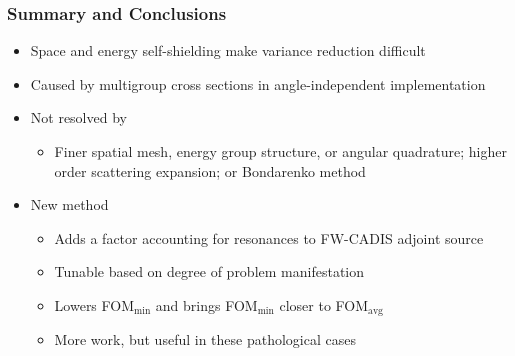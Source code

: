 \documentclass[xcolor=x11names,compress]{beamer}
\renewcommand{\(}{\begin{columns}}
\renewcommand{\)}{\end{columns}}
\newcommand{\<}[1]{\begin{column}{#1}}
\renewcommand{\>}{\end{column}}
\begin{document}
\begin{frame}[fragile]
  \frametitle{Summary and Conclusions}
  
  \begin{itemize}
  \item Space and energy self-shielding make variance reduction difficult
  
  \item Caused by multigroup cross sections in angle-independent implementation
  
  \item Not resolved by
   \begin{itemize}
   \item Finer spatial mesh, energy group structure, or angular quadrature; higher order scattering expansion; or Bondarenko method
   \end{itemize}
   
  \item New method
   \begin{itemize}
  	\item Adds a factor accounting for resonances to FW-CADIS adjoint source
  	\item Tunable based on degree of problem manifestation
	\item Lowers FOM$_{\min}$ and brings FOM$_{\min}$ closer to FOM$_{\text{avg}}$
	\item More work, but useful in these pathological cases
   \end{itemize}
  \end{itemize}

\end{frame}


\end{document}
